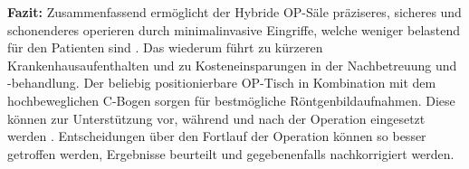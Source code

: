 \textbf{Fazit:} Zusammenfassend ermöglicht der Hybride OP-Säle präziseres, sicheres und schonenderes operieren durch minimalinvasive Eingriffe, welche weniger belastend für den Patienten sind \cite{DresdnerUniklinikum}. Das wiederum  führt zu kürzeren Krankenhausaufenthalten und zu Kosteneinsparungen in der Nachbetreuung und -behandlung. Der beliebig positionierbare OP-Tisch in Kombination mit dem hochbeweglichen C-Bogen sorgen für bestmögliche Röntgenbildaufnahmen. Diese können zur Unterstützung vor, während und nach der Operation eingesetzt werden \cite{DresdnerUniklinikum}. Entscheidungen über den Fortlauf der Operation können so besser getroffen werden, Ergebnisse beurteilt und gegebenenfalls nachkorrigiert werden.


